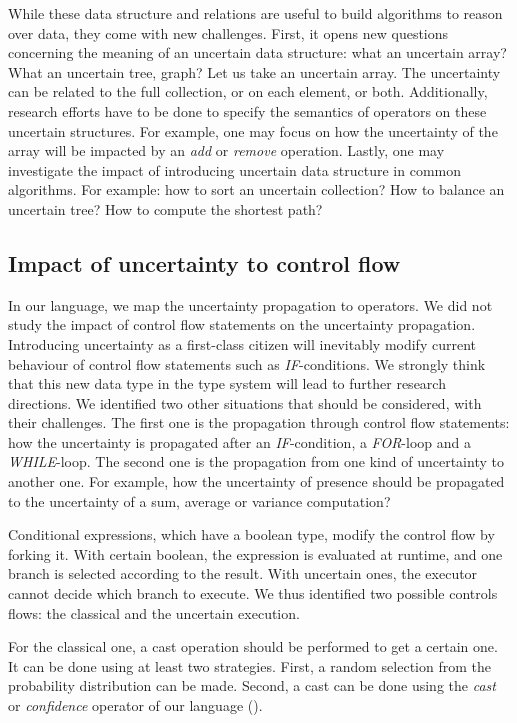 While these data structure and relations are useful to build algorithms to reason over data, they come with new challenges.
First, it opens new questions concerning the meaning of an uncertain data structure: what an uncertain array? What an uncertain tree, graph?
Let us take an uncertain array.
The uncertainty can be related to the full collection, or on each element, or both.
Additionally, research efforts have to be done to specify the semantics of operators on these uncertain structures.
For example, one may focus on how the uncertainty of the array will be impacted by an \textit{add} or \textit{remove} operation.
Lastly, one may investigate the impact of introducing uncertain data structure in common algorithms.
For example: how to sort an uncertain collection? How to balance an uncertain tree? How to compute the shortest path?

\subsection{Impact of uncertainty to control flow}
In our language, we map the uncertainty propagation to operators.
We did not study the impact of control flow statements on the uncertainty propagation.
Introducing uncertainty as a first-class citizen will inevitably modify current behaviour of control flow statements such as \textit{IF}-conditions.
We strongly think that this new data type in the type system will lead to further research directions.
We identified two other situations that should be considered, with their challenges.
The first one is the propagation through control flow statements: how the uncertainty is propagated after an \textit{IF}-condition, a \textit{FOR}-loop and a \textit{WHILE}-loop.
The second one is the propagation from one kind of uncertainty to another one.
For example, how the uncertainty of presence should be propagated to the uncertainty of a sum, average or variance computation?

Conditional expressions, which have a boolean type, modify the control flow by forking it.
With certain boolean, the expression is evaluated at runtime, and one branch is selected according to the result.
With uncertain ones, the executor cannot decide which branch to execute.
We thus identified two possible controls flows: the classical and the uncertain execution.

For the classical one, a cast operation should be performed to get a certain one.
It can be done using at least two strategies.
First, a random selection from the probability distribution can be made.
Second, a cast can be done using the \textit{cast} or \textit{confidence} operator of our language (\cf {}).

